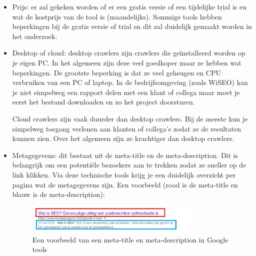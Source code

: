\begin{itemize}
\item Prijs: er zal gekeken worden of er een gratis versie of een tijdelijke trial is en wat de kostprijs van de tool is (maandelijks). Sommige tools hebben beperkingen bij de gratis versie of trial en dit zal duidelijk gemaakt worden in het onderzoek. 
\item Desktop of cloud: 
desktop crawlers zijn crawlers die geïnstalleerd worden op je eigen PC. In het algemeen zijn deze veel goedkoper maar ze hebben wat beperkingen. De grootste beperking is dat ze veel geheugen en CPU verbruiken van een PC of laptop. In de bedrijfsomgeving (zoals WiSEO) kan je niet simpelweg een rapport delen met een klant of collega maar moet je eerst het bestand downloaden en zo het project doorsturen. 

Cloud crawlers zijn vaak duurder dan desktop crawlers. Bij de meeste kun je simpelweg toegang verlenen aan klanten of collega’s zodat ze de resultaten kunnen zien. Over het algemeen zijn ze krachtiger dan desktop crawlers. 

\item Metagegevens: dit bestaat uit de meta-title en de meta-description. Dit is belangrijk om een potentiële bezoekers aan te trekken zodat ze sneller op de link klikken. Via deze technische tools krijg je een duidelijk overzicht per pagina wat de metagegevens zijn. Een voorbeeld (rood is de meta-title en blauw is de meta-description):

\begin{figure}[h!]
\centering
\includegraphics[width=0.8\textwidth]{img/metadescription.png}
\caption{Een voorbeeld van een meta-title en meta-description in Google tools
\autocite{google.be}}
\end{figure}


\end{itemize}
